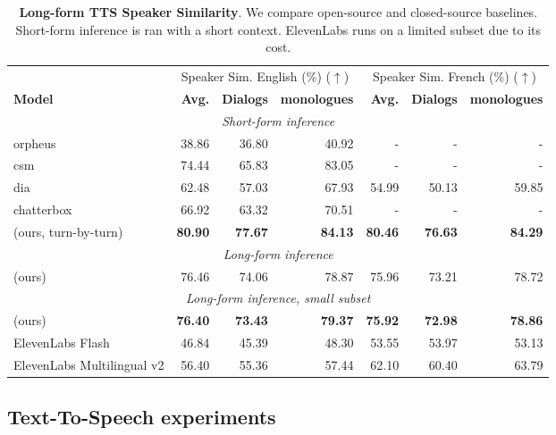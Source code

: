 \documentclass{article}
\begin{document}
\begin{table}[t]
\tiny
\centering
\caption{\textbf{Long-form TTS Speaker Similarity}. We compare open-source and closed-source baselines. 
Short-form inference is ran with a short context. ElevenLabs runs on a limited subset due to its cost.}
\label{tab:longform_similarity}
\begin{sc}
\begin{tabular}{l|r|rr|r|rr}
\toprule
  &  \multicolumn{3}{c|}{Speaker Sim. English (\%) ($\uparrow$)}  &
    \multicolumn{3}{c}{Speaker Sim. French (\%) ($\uparrow$)}  \\
\textbf{Model} & \textbf{Avg.} & \textbf{Dialogs} & \textbf{monologues} & \textbf{Avg.} & \textbf{Dialogs} & \textbf{monologues}\\
\midrule
\multicolumn{7}{c}{\textit{Short-form inference}} \\
\midrule[0.01pt]
orpheus & 38.86 & 36.80 & 40.92 & - & - & -\\
csm & 74.44 & 65.83 & 83.05 & - & - & -\\
dia & 62.48 & 57.03 & 67.93 & 54.99 & 50.13 & 59.85\\
chatterbox & 66.92 & 63.32 & 70.51 & - & - & -\\
\oursTTS{} (ours, turn-by-turn) & \textbf{80.90} & \textbf{77.67} & \textbf{84.13} & \textbf{80.46} & \textbf{76.63} & \textbf{84.29}\\
\midrule
\multicolumn{7}{c}{\textit{Long-form inference}} \\
\midrule[0.01pt]
\oursTTS{} (ours) & 76.46 & 74.06 & 78.87 & 75.96 & 73.21 & 78.72\\
\midrule
\multicolumn{7}{c}{\textit{Long-form inference, small subset}} \\
\midrule[0.01pt]
\oursTTS{} (ours) & \textbf{76.40} & \textbf{73.43} & \textbf{79.37} & \textbf{75.92} & \textbf{72.98} & \textbf{78.86}\\
ElevenLabs Flash & 46.84 & 45.39 & 48.30 & 53.55 & 53.97 & 53.13\\
ElevenLabs Multilingual v2 & 56.40 & 55.36 & 57.44 & 62.10 & 60.40 & 63.79\\
\bottomrule
\end{tabular}
\end{sc}
\end{table}


\subsection{Text-To-Speech experiments}
\label{sec:experiments:tts}
\end{document}
